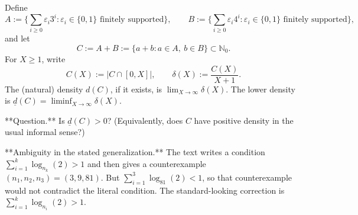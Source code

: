 Define
\[
A:=\Big\{\sum_{i\ge 0} \varepsilon_i 3^i : \varepsilon_i\in\{0,1\}\text{ finitely supported}\Big\},\qquad
B:=\Big\{\sum_{i\ge 0} \varepsilon_i 4^i : \varepsilon_i\in\{0,1\}\text{ finitely supported}\Big\},
\]
and let
\[
C:=A+B:=\{a+b: a\in A,\ b\in B\} \subset \mathbb{N}_0.
\]
For $X\ge 1$, write
\[
C(X):=|C\cap [0,X]|,\qquad \delta(X):=\frac{C(X)}{X+1}.
\]
The (natural) density $d(C)$, if it exists, is $\lim_{X\to\infty} \delta(X)$.
The lower density is $\underline d(C)=\liminf_{X\to\infty} \delta(X)$.

**Question.** Is $\underline d(C)>0$? (Equivalently, does $C$ have positive density in the usual informal sense?)

**Ambiguity in the stated generalization.** The text writes a condition
$\sum_{i=1}^k \log_{n_k}(2)>1$ and then gives a counterexample $(n_1,n_2,n_3)=(3,9,81)$.
But $\sum_{i=1}^3 \log_{81}(2)<1$, so that counterexample would not contradict the literal condition.
The standard-looking correction is $\sum_{i=1}^k \log_{n_i}(2)>1$.
